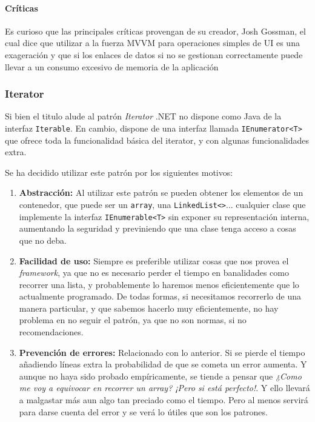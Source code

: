 \paragraph{Cr\'{i}ticas}
Es curioso que las principales cr\'{i}ticas provengan de su creador, Josh Gossman, el cual dice que utilizar a la fuerza MVVM para operaciones simples
de UI es una exageraci\'{o}n y que si los enlaces de datos si no se gestionan correctamente puede llevar a un consumo excesivo de 
memoria de la aplicaci\'{o}n \cite{MVVM:Criticism}

\subsubsection{Iterator}
Si bien el titulo alude al patr\'{o}n \emph{Iterator} .NET no dispone como Java de la interfaz \texttt{Iterable}.
En cambio, dispone de una interfaz llamada \texttt{IEnumerator<T>} que ofrece toda la funcionalidad b\'{a}sica del iterator,
y con algunas funcionalidades extra.

Se ha decidido utilizar este patr\'{o}n por los siguientes motivos:
\begin{enumerate}
    \item \textbf{Abstracci\'{o}n:}
    Al utilizar este patr\'{o}n se pueden obtener los elementos de un contenedor, que puede ser un \texttt{array}, una \texttt{LinkedList<>}...
    cualquier clase que implemente la interfaz \texttt{IEnumerable<T>} sin
    exponer su representaci\'{o}n interna, aumentando la seguridad y previniendo que una clase tenga acceso a cosas que no deba.
    
    \item \textbf{Facilidad de uso:}
    Siempre es preferible utilizar cosas que nos provea el \emph{framework}, ya que no es necesario perder el tiempo en banalidades como 
    recorrer una lista, y probablemente lo haremos menos eficientemente que lo actualmente programado. De todas formas, si necesitamos
    recorrerlo de una manera particular, y que sabemos hacerlo muy eficientemente, no hay problema en no seguir el patr\'{o}n, ya que no son
    normas, si no recomendaciones.
    
    \item \textbf{Prevenci\'{o}n de errores:}
    Relacionado con lo anterior. Si se pierde el tiempo a\~{n}adiendo l\'{i}neas extra la probabilidad de que se cometa un error 
    aumenta. Y aunque no haya sido probado emp\'{i}ricamente, se tiende a pensar que \emph{¿Como me voy a equivocar en 
    recorrer un array? ¡Pero si est\'{a} perfecto!}. 
    Y ello llevar\'{a} a malgastar m\'{a}s aun algo tan preciado como el tiempo. Pero al menos servir\'a para darse cuenta del error y 
    se ver\'a lo \'{u}tiles que son los patrones.
\end{enumerate}

